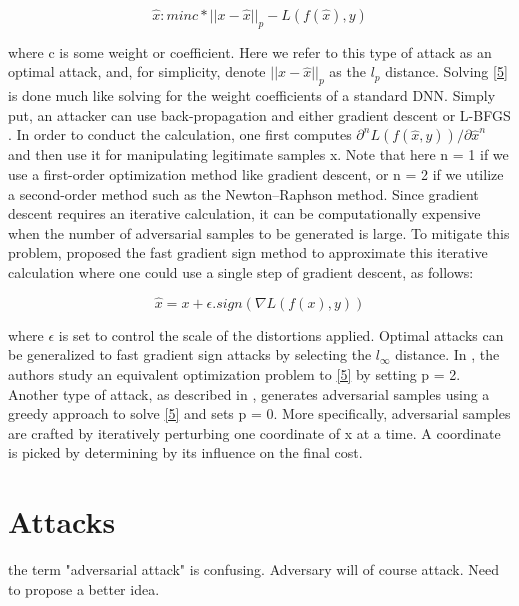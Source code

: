 \documentclass[a4paper]{article}
\newcommand{\ach}[1]{{\color{red}#1}}
\begin{document}
\begin{equation}\label{5}
	\hat{x}: min c*||x - \hat{x}||_p - L(f(\hat{x}), y)
\end{equation}

where c is some weight or coefficient. Here we refer to this type of attack as an optimal attack, and, for simplicity, denote $||x − \hat{x}||_p$ as the $l_p$ distance. Solving \eqref{5} is done much like solving for the weight coefficients of a standard DNN. Simply put, an attacker can use back-propagation and either gradient descent \cite{szegedy2013intriguing} or L-BFGS \cite{carlini2017towards}. In order to conduct the calculation, one first computes $\partial^n L(f(\hat{x}, y)) / \partial \hat{x}^n$ and then use it for manipulating legitimate samples x. Note that here n = 1 if we use a first-order optimization method like gradient descent, or n = 2 if we utilize a second-order method such as the Newton–Raphson method. Since gradient descent requires an iterative calculation, it can be computationally expensive when the number of adversarial samples to be generated is large. To mitigate this problem, \cite{szegedy2013intriguing} proposed the fast gradient sign method to approximate this iterative calculation where one could use a single step of gradient descent, as follows:

\begin{equation}
	\hat{x} = x + \epsilon . sign(\nabla L(f(x), y))
\end{equation}

where $\epsilon$ is set to control the scale of the distortions applied. Optimal attacks can be generalized to fast gradient sign attacks by selecting the $l_\infty$ distance. In \cite{szegedy2013intriguing}, the authors study an equivalent optimization problem to \eqref{5} by setting p = 2. Another type of attack, as described in \cite{papernot2016limitations}, generates adversarial samples using a greedy approach to solve \eqref{5} and sets p = 0. More specifically, adversarial samples are crafted by iteratively perturbing one coordinate of x at a time. A coordinate is picked by determining by its influence on the final cost.
	
\section{Attacks}\label{attacks}
\ach{the term "adversarial attack" is confusing. Adversary will of course attack. Need to propose a better idea.}
\end{document}
